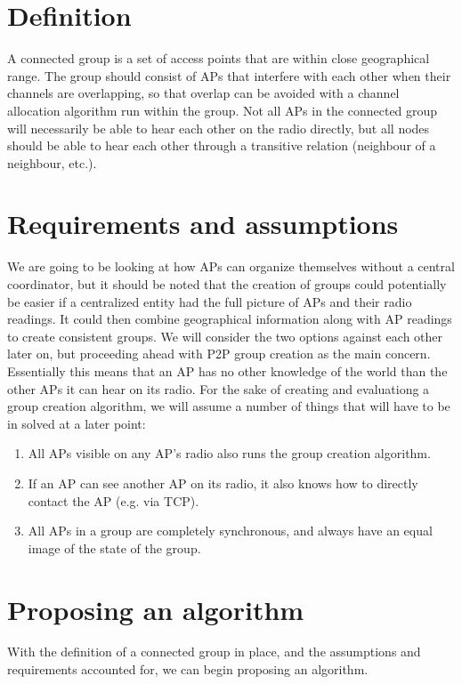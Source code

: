 \documentclass[a4paper,UKenglish]{report}
\begin{document}
\section{Definition}
A connected group is a set of access points that are within close geographical range. The group should consist of APs that
interfere with each other when their channels are overlapping, so that overlap can be avoided with a channel allocation algorithm run within the group.
Not all APs in the connected group will necessarily be able to hear each other on the radio directly,
but all nodes should be able to hear each other through a transitive relation (neighbour of a neighbour, etc.).

\section{Requirements and assumptions}
We are going to be looking at how APs can organize themselves without a central coordinator,
but it should be noted that the creation of groups could potentially be easier if a centralized entity had the full picture of APs and their radio readings.
It could then combine geographical information along with AP readings to create consistent groups.
We will consider the two options against each other later on, but proceeding ahead with P2P group creation as the main concern. 
Essentially this means that an AP has no other knowledge of the world than the other APs it can hear on its radio.
For the sake of creating and evaluationg a group creation algorithm, we will assume a number of things that will have to be in solved at a later point:
\begin{enumerate}
	\item All APs visible on any AP's radio also runs the group creation algorithm.
	\item If an AP can see another AP on its radio, it also knows how to directly contact the AP (e.g. via TCP).
	\item All APs in a group are completely synchronous, and always have an equal image of the state of the group. 
\end{enumerate}

\section{Proposing an algorithm}\label{algorithm}
With the definition of a connected group in place, and the assumptions and requirements accounted for, we can begin proposing an algorithm.
\end{document}
